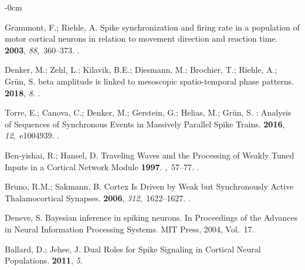 \documentclass[brainsci, %
               review,submit,pdftex,moreauthors
               ]{Definitions/mdpi}
\begin{document}
\begin{adjustwidth}{-\extralength}{0cm}
\begin{thebibliography}{999}
  Grammont, F.; Riehle, A.
  \newblock Spike synchronization and firing rate in a population of motor
    cortical neurons in relation to movement direction and reaction time.
   {\bf 2003}, {\em 88},~360--373.
  .
  
  Denker, M.; Zehl, L.; Kilavik, B.E.; Diesmann, M.; Brochier, T.; Riehle, A.;
    Grün, S.
   beta amplitude is linked to mesoscopic spatio-temporal phase
    patterns.
   {\bf 2018}, {\em 8}.
  .
  
  Torre, E.; Canova, C.; Denker, M.; Gerstein, G.; Helias, M.; Grün, S.
  : {Analysis} of {Sequences} of {Synchronous} {Events} in
    {Massively} {Parallel} {Spike} {Trains}.
   {\bf 2016}, {\em 12},~e1004939.
  .
  
  Ben-yishai, R.; Hansel, D.
  \newblock Traveling {Waves} and the {Processing} of {Weakly} {Tuned} {Inputs}
    in a {Cortical} {Network} {Module} {\bf 1997}.
  ,~57--77.
  .
  
  Bruno, R.M.; Sakmann, B.
  \newblock Cortex {Is} {Driven} by {Weak} but {Synchronously} {Active}
    {Thalamocortical} {Synapses}.
   {\bf 2006}, {\em 312},~1622--1627.
  .
  
  Deneve, S.
  \newblock Bayesian inference in spiking neurons.
  \newblock In Proceedings of the Advances in {Neural} {Information} {Processing}
    {Systems}. MIT Press,  2004, Vol.~17.
  
  Ballard, D.; Jehee, J.
  \newblock Dual {Roles} for {Spike} {Signaling} in {Cortical} {Neural}
    {Populations}.
   {\bf 2011}, {\em 5}.
  

\end{thebibliography}
\end{adjustwidth}
\end{document}
